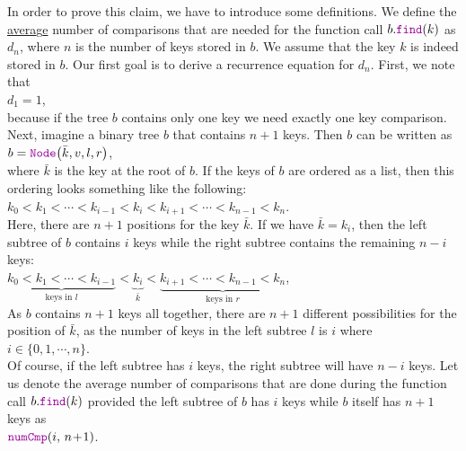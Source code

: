 In order to prove this claim, we have to introduce some definitions.
We define the \underline{avera}g\underline{e} number of comparisons that are needed for the function
call $b.\mytt{find}(k)$ as  $d_n$, where $n$ is the number of keys stored in $b$.  We assume that
the key $k$ is indeed stored in $b$.  Our first goal is to derive a recurrence equation for 
$d_n$.  First, we note that  
\\[0.2cm]
\hspace*{1.3cm} $d_1 = 1$,
\\[0.2cm]
because if the tree $b$ contains only one key we need exactly one key comparison.
Next, imagine a binary tree $b$ that contains $n+1$ keys.  Then $b$
can be written as 
\\[0.2cm]
\hspace*{1.3cm}
$b = \mytt{Node}\bigl(\bar{k},v,l,r\bigr)$,
\\[0.2cm]
where $\bar{k}$ is the key at the root of $b$.  If the keys of $b$ are ordered as a list, then this
ordering looks something like the following:
\\[0.2cm]
\hspace*{1.3cm}
$k_0 < k_1 < \cdots < k_{i-1} < k_{i} < k_{i+1} < \cdots < k_{n-1} < k_n$.
\\[0.2cm]
Here, there are $n+1$ positions for the key $\bar{k}$.
If we have $\bar{k} = k_i$, then the left subtree of $b$ contains  $i$ keys while the right subtree
contains the remaining  $n-i$ keys:
\\[0.2cm]
\hspace*{1.3cm}
$\underbrace{k_0 < k_1 < \cdots < k_{i-1}}_{\mbox{keys in $l$}} < 
 \underbrace{k_{i}}_{\displaystyle \bar{k}} < 
 \underbrace{k_{i+1} < \cdots < k_{n-1} < k_n}_{\mbox{keys in $r$}}$,
\\[0.2cm]
As  $b$ contains $n+1$ keys all together, there are  $n+1$ different possibilities for the position
of $\bar{k}$, as the number of keys in the left subtree $l$ is $i$ where
\\[0.2cm]
\hspace*{1.3cm}
 $i \in \{0,1, \cdots, n\}$.
\\[0.2cm]
Of course, if the left subtree has $i$ keys, the right subtree will have $n-i$ keys.
Let us denote the average number of comparisons that are done during the function call
$b.\mytt{find}(k)$ provided the left subtree of $b$ has $i$ keys while $b$ itself has $n+1$ keys
as
\\[0.2cm]
\hspace*{1.3cm}
$\mytt{numCmp}(i,\, n\!+\!1)$.

